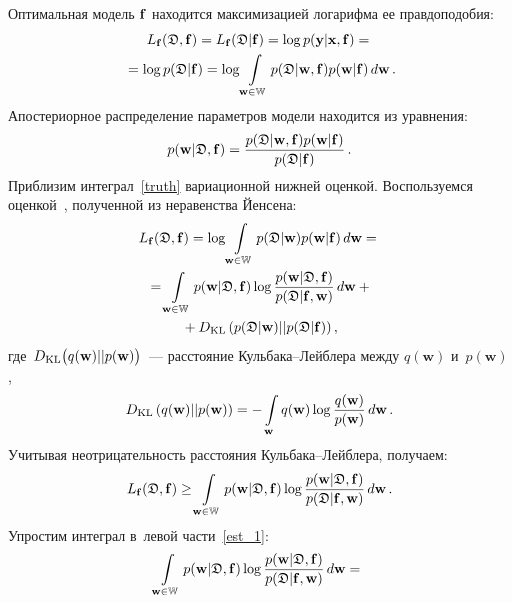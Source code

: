 \begin{multicols}{2}
Оптимальная модель ${\mathbf{f}}$ находится максимизацией логарифма ее правдоподобия:
\begin{multline}
L_{\mathbf{f}}(\mathfrak{D},{\mathbf{f}}) = L_{\mathbf{f}}(\mathfrak{D}|{\mathbf{f}}) = \log p({\mathbf{y}}|{\mathbf{x}},{\mathbf{f}}) ={}\\
{}= \log 
p(\mathfrak{D}|{\mathbf{f}}) = \log \int\limits_{\mathbf{w} \in \mathbb{W}}
p(\mathfrak{D}|\mathbf{w},{\mathbf{f}})p(\mathbf{w}|{\mathbf{f}})\,d\mathbf{w}\,. 
\label{truth}
\end{multline}
Апостериорное распределение параметров модели находится из уравнения:
\begin{equation}
p(\mathbf{w}|\mathfrak{D},{\mathbf{f}}) = \displaystyle\frac{\displaystyle p(\mathfrak{D}|\mathbf{w},{\mathbf{f}})p(\mathbf{w}|{\mathbf{f}})\mathstrut}{\displaystyle p(\mathfrak{D}|{\mathbf{f}})\mathstrut}\,.
\label{param}
\end{equation}
Приблизим интеграл~\eqref{truth} вариационной нижней оценкой. Воспользуемся 
оценкой~\cite[разд.~10.2--10.4]{Bishop}, полученной из неравенства Йенсена:
\begin{multline*}
L_{\mathbf{f}}(\mathfrak{D},{\mathbf{f}}) = \log\int\limits_{\mathbf{w} \in \mathbb{W}}
p(\mathfrak{D}|\mathbf{w})p(\mathbf{w}|{\mathbf{f}})\,d\mathbf{w} 
={}\\
{}=\int\limits_{\mathbf{w} \in 
\mathbb{W}}p(\mathbf{w}|\mathfrak{D},{\mathbf{f}})\log\displaystyle\frac{\displaystyle p(\mathbf{w}|\mathfrak{D},{\mathbf{f}})\mathstrut}{\displaystyle p(\mathfrak{D}|{\mathbf{f}},\mathbf{w})\mathstrut}\,d\mathbf{w} + {}\\
{}+
D_{\mathrm{KL}}\left(p(\mathfrak{D}|\mathbf{w})||p(\mathfrak{D}|{\mathbf{f}})\right),
\end{multline*}
где~$D_{\mathrm{KL}}\bigl(q(\mathbf{w})||p(\mathbf{w})\bigr)$~--- расстояние Куль\-ба\-ка--Лейб\-ле\-ра между 
$q(\mathbf{w})$ и~$p(\mathbf{w})$,
\begin{equation*}
 D_{\mathrm{KL}}\left(q(\mathbf{w})||p(\mathbf{w})\right) = - 
\int\limits_{\mathbf{w}}q(\mathbf{w})\log\displaystyle\frac{\displaystyle q(\mathbf{w})\mathstrut}{\displaystyle p(\mathbf{w})\mathstrut}\,d\mathbf{w}\,.
\end{equation*}
Учитывая неотрицательность расстояния Куль\-ба\-ка--Лейб\-ле\-ра, получаем:
\begin{equation}
L_{\mathbf{f}}(\mathfrak{D},{\mathbf{f}}) \geq \int\limits_{\mathbf{w} \in 
\mathbb{W}}p(\mathbf{w}|\mathfrak{D},{\mathbf{f}})\log
\displaystyle\frac{\displaystyle p(\mathbf{w}|\mathfrak{D},{\mathbf{f}})\mathstrut}{\displaystyle p(\mathfrak{D}|{\mathbf{f}},\mathbf{w})\mathstrut}\,d\mathbf{w}\,.
\label{est_1}
\end{equation}
Упростим интеграл в~левой части~\eqref{est_1}:
\begin{multline}
\int\limits_{\mathbf{w} \in 
\mathbb{W}}p(\mathbf{w}|\mathfrak{D},\bbf)\log\fr{p(\mathbf{w}|\mathfrak{D},\bbf)}{p(\mathfrak{D}|\bbf,\mathbf{w})}\,d\mathbf{w} ={} \\

\end{multline}
\end{multicols}
